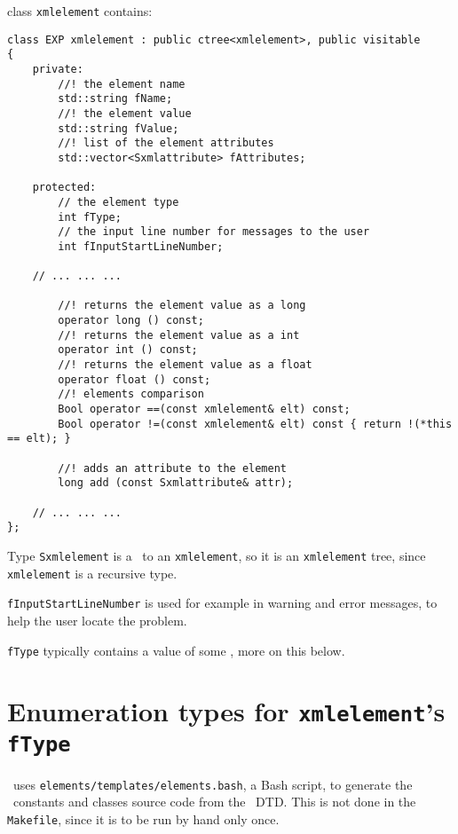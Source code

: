 class   {\tt xmlelement} contains:
\begin{lstlisting}[language=CPlusPlus]
class EXP xmlelement : public ctree<xmlelement>, public visitable
{
	private:
		//! the element name
		std::string fName;
		//! the element value
		std::string fValue;
		//! list of the element attributes
		std::vector<Sxmlattribute> fAttributes;

	protected:
		// the element type
		int fType;
		// the input line number for messages to the user
		int fInputStartLineNumber;

	// ... ... ...

		//! returns the element value as a long
		operator long () const;
		//! returns the element value as a int
		operator int () const;
		//! returns the element value as a float
		operator float () const;
		//! elements comparison
		Bool operator ==(const xmlelement& elt) const;
		Bool operator !=(const xmlelement& elt) const { return !(*this == elt); }

		//! adds an attribute to the element
		long add (const Sxmlattribute& attr);

	// ... ... ...
};
\end{lstlisting}

Type {\tt Sxmlelement} is a \smart\ to an {\tt xmlelement}, so it is an {\tt xmlelement} tree, since {\tt xmlelement} is a recursive type.

{\tt fInputStartLineNumber} is used for example in warning and error messages, to help the user locate the problem.

{\tt fType} typically contains a value of some \enumType, more on this below.


\section{Enumeration types for {\tt xmlelement}'s {\tt fType}}

\libmusicxml\ uses {\tt elements/templates/elements.bash}, a Bash script, to generate the \enumType\ constants and classes source code from the \mxml\ DTD. This is not done in the {\tt Makefile}, since it is to be run by hand only once.

